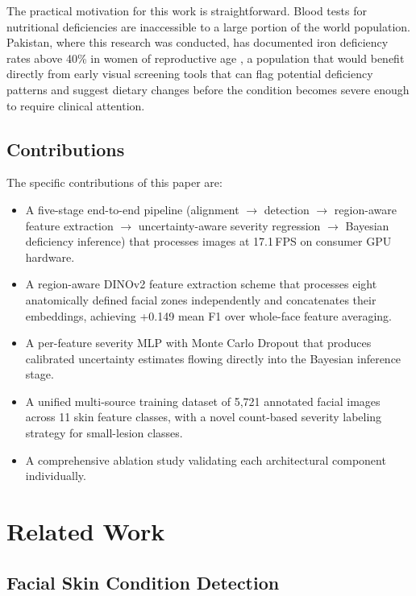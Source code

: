 \documentclass[journal]{IEEEtran}
\begin{document}
The practical motivation for this work is straightforward. Blood tests for
nutritional deficiencies are inaccessible to a large portion of the world
population. Pakistan, where this research was conducted, has documented iron
deficiency rates above 40\% in women of reproductive age \cite{aga2019},
a population that would benefit directly from early visual screening tools that
can flag potential deficiency patterns and suggest dietary changes before the
condition becomes severe enough to require clinical attention.

\subsection*{Contributions}

The specific contributions of this paper are:

\begin{itemize}
  \item A five-stage end-to-end pipeline (alignment $\to$ detection $\to$
    region-aware feature extraction $\to$ uncertainty-aware severity regression
    $\to$ Bayesian deficiency inference) that processes images at 17.1\,FPS on
    consumer GPU hardware.
  \item A region-aware DINOv2 feature extraction scheme that processes eight
    anatomically defined facial zones independently and concatenates their
    embeddings, achieving +0.149 mean F1 over whole-face feature averaging.
  \item A per-feature severity MLP with Monte Carlo Dropout that produces
    calibrated uncertainty estimates flowing directly into the Bayesian
    inference stage.
  \item A unified multi-source training dataset of 5{,}721 annotated facial
    images across 11 skin feature classes, with a novel count-based severity
    labeling strategy for small-lesion classes.
  \item A comprehensive ablation study validating each architectural component
    individually.
\end{itemize}

\section{Related Work}
\label{sec:related}

\subsection{Facial Skin Condition Detection}
\end{document}
